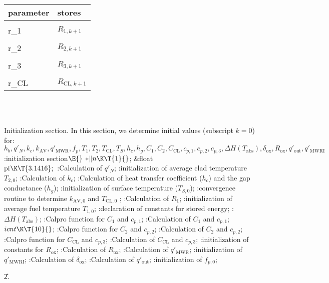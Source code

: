 \documentclass[letterpaper,12pt,baseclass=report]{cweb-hy}
\begin{document}
{{
}
\begin{tabular}{ll}
parameter   & stores        \\ \hline
\PB{\\{r\_1}} & $R_{1,k+1}$\\
\PB{\\{r\_2}} & $R_{2,k+1}$\\
\PB{\\{r\_3}} & $R_{3,k+1}$\\
\PB{\\{r\_CL}} & $R_{\mathrm{CL},k+1}$\\
\end{tabular}\\
~\newpage


\fi

Initialization section.
In this section, we determine initial values (subscript $k=0$) for:
\[
h_b,q'_N,k_c,k_{\text{AV}},q'_{\mathrm{MWR}}, f_p,
T_1, T_2, T_{\mathrm{CL}}, T_S, h_c, h_g, C_1,
C_2,C_{\text{CL}},c_{p,1},c_{p,2},c_{p,3},\Delta H(T_{\text{abs}}),
\delta_{\text{ox}},R_{\text{ox}}, q'_{\text{out}},q'_{\mathrm{MWRI}}
\]
\Y\B\4:initialization section\X${}\E{}$\6
${*}\|n\K\T{1}{}$;\7
\&{float} \\{pi}${}\K\T{3.1416};{}$\7
:Calculation of $q'_{N}$\X;\6
:initialization of average clad temperature $T_{2,0}$\X;\6
:Calculation of $k_c$\X;\6
:Calculation of heat transfer coefficient ($h_{c}$) and the gap conductance
($h_{g}$)\X;\6
:initialization of surface temperature ($T_{S,0}$)\X;\6
:convergence routine to determine $k_{\text{AV},0}$ and $T_{\text{CL},0}$%
\X;\6
:Calculation of $R_{1}$\X;\6
:initialization of average fuel temperature $T_{1,0}$\X;\6
:declaration of constants for stored energy\X;\6
:$\Delta H (T_{\text{abs}})$\X;\6
:Calpro function for $C_{1}$ and $c_{p,1}$\X;\6
:Calculation of $C_{1}$ and $c_{p,1}$\X;\6
${}\\{icnt}\K\T{10}{}$;\6
:Calpro function for $C_{2}$ and $c_{p,2}$\X;\6
:Calculation of $C_{2}$ and $c_{p,2}$\X;\6
:Calpro function for $C_{\text{CL}}$ and $c_{p,3}$\X;\6
:Calculation of $C_{\text{CL}}$ and $c_{p,3}$\X;\6
:initialization of constants for $R_{\text{ox}}$\X;\6
:Calculation of $R_{\text{ox}}$\X;\6
:Calculation of $q'_{\mathrm{MWR}}$\X;\6
:initialization of $q'_{\mathrm{MWRI}}$\X;\6
:Calculation of $\delta_{\text{ox}}$\X;\6
:Calculation of $q'_{\text{out}}$\X;\6
:initialization of $f_{p,0}$\X;\par
\U2.\fi

}
\end{document}
